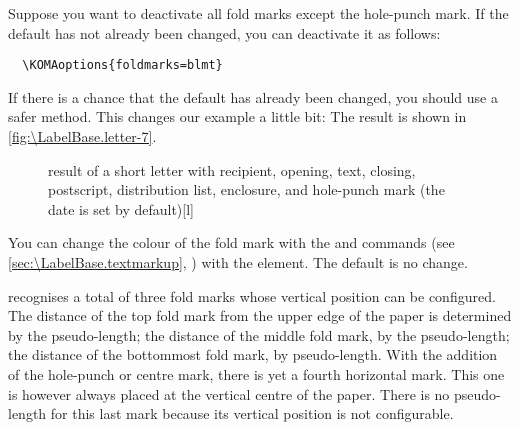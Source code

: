 %
\begin{Example}
  Suppose you want to deactivate all fold marks except the hole-punch mark. If
  the default has not already been changed, you can deactivate it as follows:
\begin{lstlisting}
  \KOMAoptions{foldmarks=blmt}
\end{lstlisting}
  If there is a chance that the default has already been changed, you should
  use a safer method. This changes our example a little bit:
  The result is shown in \autoref{fig:\LabelBase.letter-7}.
  \begin{figure}
    \setcapindent{0pt}%
    \begin{captionbeside}{%
        result of a short letter with recipient, opening, text, closing,
        postscript, distribution list, enclosure, and hole-punch mark
        (the date is set by default)}[l]
    \end{captionbeside}
    \label{fig:\LabelBase.letter-7}
  \end{figure}
\end{Example}
%
You can change the colour of the fold mark
with the  and
 commands (see
\autoref{sec:\LabelBase.textmarkup}, )
with the  element. The default is no change.%
\EndIndexGroup


\begin{Declaration}
\end{Declaration}
\KOMAScript{} recognises a total of three fold marks whose vertical position
can be configured. The distance of the top fold mark from the upper edge of
the paper is determined by the  pseudo-length; the
distance of the middle fold mark, by the
 pseudo-length; the
distance of the bottommost fold mark, by 
pseudo-length. With the addition of the hole-punch or
centre mark, there is yet a fourth
horizontal mark. This one is however always placed at the vertical centre of
the paper.
\iftrue%
There is no pseudo-length for this last mark because its vertical position is
not configurable.
\fi

